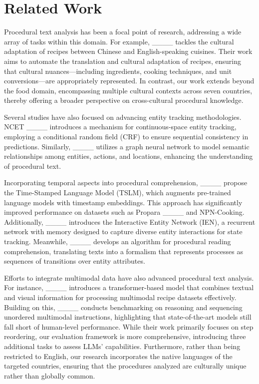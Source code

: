 \section{Related Work}
Procedural text analysis has been a focal point of research, addressing a wide array of tasks within this domain. For example, ____ tackles the cultural adaptation of recipes between Chinese and English-speaking cuisines. Their work aims to automate the translation and cultural adaptation of recipes, ensuring that cultural nuances—including ingredients, cooking techniques, and unit conversions—are appropriately represented. In contrast, our work extends beyond the food domain, encompassing multiple cultural contexts across seven countries, thereby offering a broader perspective on cross-cultural procedural knowledge. %

Several studies have also focused on advancing entity tracking methodologies. NCET ____ introduces a mechanism for continuous-space entity tracking, employing a conditional random field (CRF) to ensure sequential consistency in predictions. Similarly, ____ utilizes a graph neural network to model semantic relationships among entities, actions, and locations, enhancing the understanding of procedural text.

Incorporating temporal aspects into procedural comprehension, ____ propose the Time-Stamped Language Model (TSLM), which augments pre-trained language models with timestamp embeddings. This approach has significantly improved performance on datasets such as Propara ____ and NPN-Cooking. Additionally, ____ introduces the Interactive Entity Network (IEN), a recurrent network with memory designed to capture diverse entity interactions for state tracking. Meanwhile, ____ develops an algorithm for procedural reading comprehension, translating texts into a formalism that represents processes as sequences of transitions over entity attributes.

Efforts to integrate multimodal data have also advanced procedural text analysis. For instance, ____ introduces a transformer-based model that combines textual and visual information for processing multimodal recipe datasets effectively. Building on this, ____ conducts benchmarking on reasoning and sequencing unordered multimodal instructions, highlighting that state-of-the-art models still fall short of human-level performance. While their work primarily focuses on step reordering, our evaluation framework is more comprehensive, introducing three additional tasks to assess LLMs’ capabilities. Furthermore, rather than being restricted to English, our research incorporates the native languages of the targeted countries, ensuring that the procedures analyzed are culturally unique rather than globally common.

